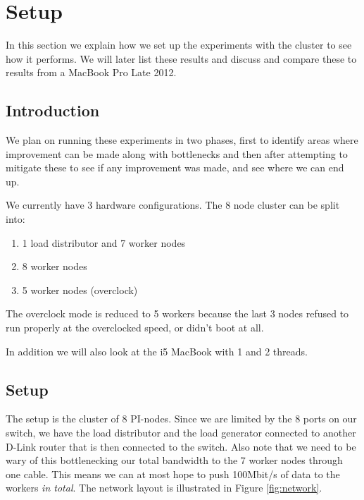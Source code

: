 \clearpage

\section{Setup}
\label{sec:setup}

In this section we explain how we set up the experiments with the cluster to see how it performs. We will later list these results and discuss and compare these to results from a MacBook Pro Late 2012. 

\subsection{Introduction}
We plan on running these experiments in two phases, first to identify areas where improvement can be made along with bottlenecks and then after attempting to mitigate these to see if any improvement was made, and see where we can end up.

We currently have 3 hardware configurations. The 8 node cluster can be split into:

\begin{enumerate}
\item 1 load distributor and 7 worker nodes
\item 8 worker nodes
\item 5 worker nodes (overclock)
\end{enumerate}

The overclock mode is reduced to 5 workers because the last 3 nodes refused to run properly at the overclocked speed, or didn't boot at all.

In addition we will also look at the i5 MacBook with 1 and 2 threads.

\subsection{Setup}
The setup is the cluster of 8 PI-nodes. Since we are limited by the 8 ports on our switch, we have the load distributor and the load generator connected to another D-Link router that is then connected to the switch.
Also note that we need to be wary of this bottlenecking our total bandwidth to the 7 worker nodes through one cable.
This means we can at most hope to push 100Mbit/s of data to the workers {\em in total}.
The network layout is illustrated in Figure \ref{fig:network}.

